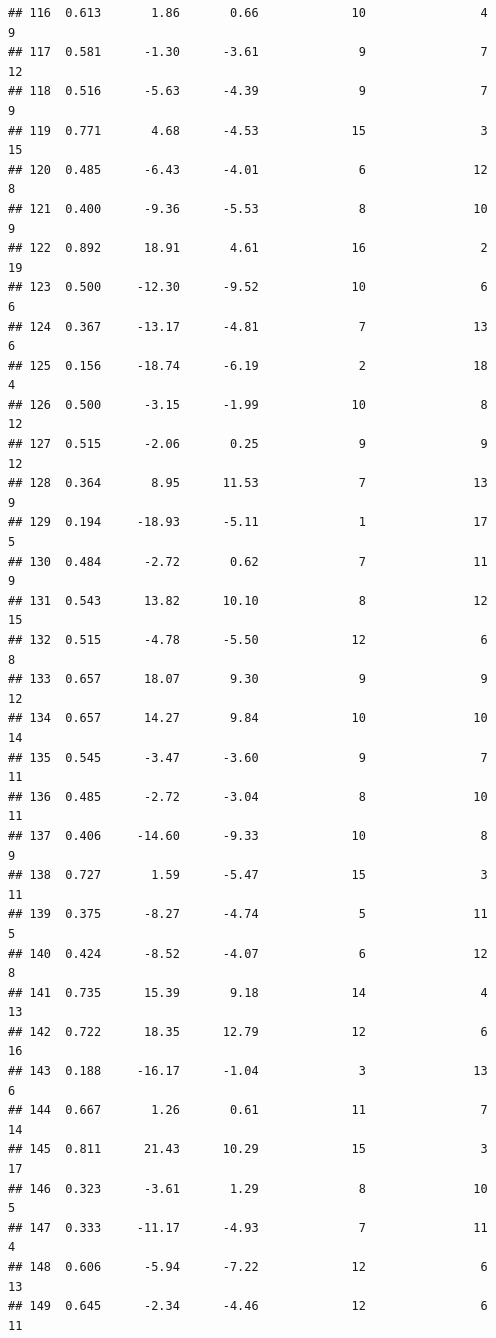 \documentclass[]{book}
\begin{document}
\begin{verbatim}
## 116  0.613       1.86       0.66             10                4        9
## 117  0.581      -1.30      -3.61              9                7       12
## 118  0.516      -5.63      -4.39              9                7        9
## 119  0.771       4.68      -4.53             15                3       15
## 120  0.485      -6.43      -4.01              6               12        8
## 121  0.400      -9.36      -5.53              8               10        9
## 122  0.892      18.91       4.61             16                2       19
## 123  0.500     -12.30      -9.52             10                6        6
## 124  0.367     -13.17      -4.81              7               13        6
## 125  0.156     -18.74      -6.19              2               18        4
## 126  0.500      -3.15      -1.99             10                8       12
## 127  0.515      -2.06       0.25              9                9       12
## 128  0.364       8.95      11.53              7               13        9
## 129  0.194     -18.93      -5.11              1               17        5
## 130  0.484      -2.72       0.62              7               11        9
## 131  0.543      13.82      10.10              8               12       15
## 132  0.515      -4.78      -5.50             12                6        8
## 133  0.657      18.07       9.30              9                9       12
## 134  0.657      14.27       9.84             10               10       14
## 135  0.545      -3.47      -3.60              9                7       11
## 136  0.485      -2.72      -3.04              8               10       11
## 137  0.406     -14.60      -9.33             10                8        9
## 138  0.727       1.59      -5.47             15                3       11
## 139  0.375      -8.27      -4.74              5               11        5
## 140  0.424      -8.52      -4.07              6               12        8
## 141  0.735      15.39       9.18             14                4       13
## 142  0.722      18.35      12.79             12                6       16
## 143  0.188     -16.17      -1.04              3               13        6
## 144  0.667       1.26       0.61             11                7       14
## 145  0.811      21.43      10.29             15                3       17
## 146  0.323      -3.61       1.29              8               10        5
## 147  0.333     -11.17      -4.93              7               11        4
## 148  0.606      -5.94      -7.22             12                6       13
## 149  0.645      -2.34      -4.46             12                6       11

\end{verbatim}
\end{document}
